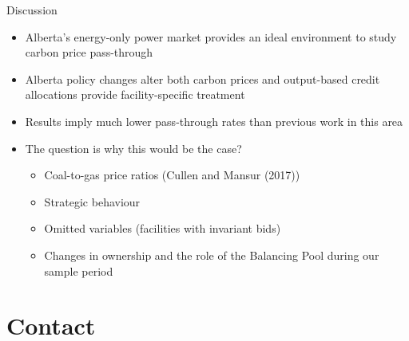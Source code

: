 \documentclass[aspectratio=169]{beamer}
\begin{document}
\begin{frame}{Discussion}
   \begin{itemize}
   \item Alberta's energy-only power market provides an ideal environment to study carbon price pass-through
    \item Alberta policy changes alter both carbon prices and output-based credit allocations provide facility-specific treatment
    \item Results imply much lower pass-through rates than previous work in this area
    \item The question is why this would be the case?
    \small\begin{itemize}
    \item Coal-to-gas price ratios (Cullen and Mansur (2017))
    \item Strategic behaviour
    \item Omitted variables (facilities with invariant bids)
    \item Changes in ownership and the role of the Balancing Pool during our sample period
    \end{itemize}
     \end{itemize}
   \vfill
\end{frame}



\section{Contact}


\end{document}
